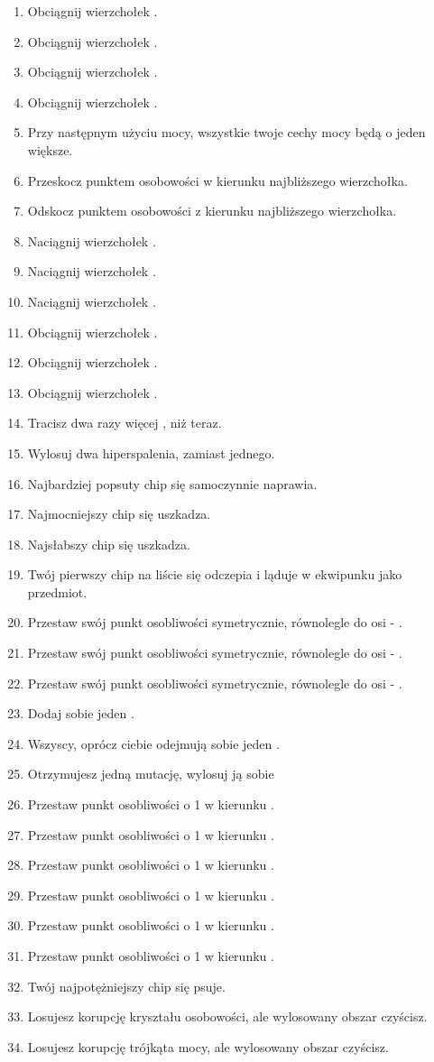 \begin{enumerate}
	\item Obciągnij wierzchołek \abs{}.
	\item Obciągnij wierzchołek \abt{}.
	\item Obciągnij wierzchołek \abh{}.
	\item Obciągnij wierzchołek \abp{}.
	\item Przy następnym użyciu mocy, wszystkie twoje cechy mocy będą o jeden większe.
	\item Przeskocz punktem osobowości w kierunku najbliższego wierzchołka.
	\item Odskocz punktem osobowości z kierunku najbliższego wierzchołka.
	\item Naciągnij wierzchołek \absm{}.
	\item Naciągnij wierzchołek \abdm{}.
	\item Naciągnij wierzchołek \abrm{}.
	\item Obciągnij wierzchołek \absm{}.
	\item Obciągnij wierzchołek \abdm{}.
	\item Obciągnij wierzchołek \abrm{}.
	\item Tracisz dwa razy więcej \abkar{}, niż teraz.
	\item Wylosuj dwa hiperspalenia, zamiast jednego.
	\item Najbardziej popsuty chip się samoczynnie naprawia.
	\item Najmocniejszy chip się uszkadza.
	\item Najsłabszy chip się uszkadza.
	\item Twój pierwszy chip na liście się odczepia i ląduje w ekwipunku jako przedmiot.
	\item Przestaw swój punkt osobliwości symetrycznie, równolegle do osi \abh{} - \abt{}.
	\item Przestaw swój punkt osobliwości symetrycznie, równolegle do osi \abi{} - \abs{}.
	\item Przestaw swój punkt osobliwości symetrycznie, równolegle do osi \aba{} - \abp{}.
	\item Dodaj sobie jeden \abnkp{}.
	\item Wszyscy, oprócz ciebie odejmują sobie jeden \abnkp{}.
	\item Otrzymujesz jedną mutację, wylosuj ją sobie
	\item Przestaw punkt osobliwości o 1 w kierunku \abi{}.
	\item Przestaw punkt osobliwości o 1 w kierunku \abs{}.
	\item Przestaw punkt osobliwości o 1 w kierunku \abp{}.
	\item Przestaw punkt osobliwości o 1 w kierunku \aba{}.
	\item Przestaw punkt osobliwości o 1 w kierunku \abt{}.
	\item Przestaw punkt osobliwości o 1 w kierunku \abh{}.
	\item Twój najpotężniejszy chip się psuje.
	\item Losujesz korupcję kryształu osobowości, ale wylosowany obszar czyścisz.
	\item Losujesz korupcję trójkąta mocy, ale wylosowany obszar czyścisz.
	

\end{enumerate}
